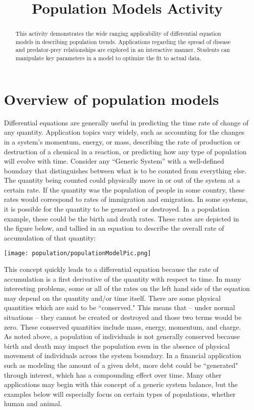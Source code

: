 \documentclass{ximera}
\title{Population Models Activity}
\begin{document}
   
\begin{abstract}
This activity demonstrates the wide ranging applicability of differential equation models in describing population trends.  Applications regarding the spread of disease and predator-prey relationships are explored in an interactive manner.  Students can manipulate key parameters in a model to optimize the fit to actual data.    
\end{abstract}
   
\maketitle
   
\section*{Overview of population models}
Differential equations are generally useful in predicting the time rate of change of any quantity.  Application topics vary widely, such as accounting for the changes in a system’s momentum, energy, or mass, describing the rate of production or destruction of a chemical in a reaction, or predicting how any type of population will evolve with time.  Consider any “Generic System” with a well-defined boundary that distinguishes between what is to be counted from everything else.  The quantity being counted could physically move in or out of the system at a certain rate.  If the quantity was the population of people in some country, these rates would correspond to rates of immigration and emigration.  In some systems, it is possible for the quantity to be generated or destroyed.  In a population example, these could be the birth and death rates.  These rates are depicted in the figure below, and tallied in an equation to describe the overall rate of accumulation of that quantity: 
 
 \begin{image}
 \texttt{[image: population/populationModelPic.png]} 
\end{image}

This concept quickly leads to a differential equation because the rate of accumulation is a first derivative of the quantity with respect to time.  In many interesting problems, some or all of the rates on the left hand side of the equation may depend on the quantity and/or time itself.  There are some physical quantities which are said to be ``conserved."  This means that -- under normal situations – they cannot be created or destroyed and those two terms would be zero.  These conserved quantities include mass, energy, momentum, and charge.  As noted above, a population of individuals is not generally conserved because birth and death may impact the population even in the absence of physical movement of individuals across the system boundary.  In a financial application such as modeling the amount of a given debt, more debt could be ``generated" through interest, which has a compounding effect over time.  Many other applications may begin with this concept of a generic system balance, but the examples below will especially focus on certain types of populations, whether human and animal.
 
\end{document}
